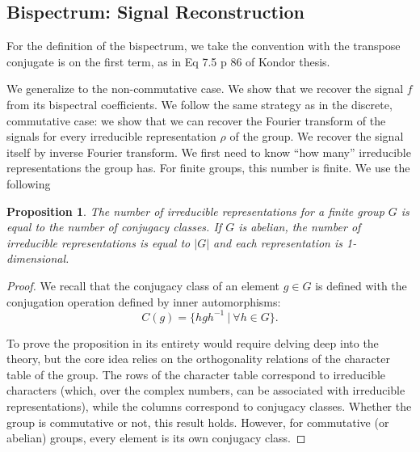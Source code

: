 \documentclass{article}
\newtheorem{proposition}{Proposition}
\begin{document}
\subsection{Bispectrum: Signal Reconstruction}

For the definition of the bispectrum, we take the convention with the transpose conjugate is on the first term, as in Eq 7.5 p 86 of Kondor thesis.






We generalize to the non-commutative case.  We show that we recover the signal $f$ from its bispectral coefficients. We follow the same strategy as in the discrete, commutative case: we show that we can recover the Fourier transform of the signals for every irreducible representation $\rho$ of the group. We recover the signal itself by inverse Fourier transform. We first need to know ``how many'' irreducible representations the group has. For finite groups, this number is finite. We use the following

    \begin{proposition}
        The number of irreducible representations for a finite group $G$ is equal to the number of conjugacy classes. If $G$ is abelian, the number of irreducible representations is equal to $|G|$ and each representation is 1-dimensional.
    \end{proposition}

\begin{proof}
    We recall that the conjugacy class of an element $g \in G$ is defined with the conjugation operation defined by inner automorphisms:
    \begin{equation}
        C(g) = \{ hgh^{-1} ~|~ \forall h \in G\}.
    \end{equation}

    To prove the proposition in its entirety would require delving deep into the theory, but the core idea relies on the orthogonality relations of the character table of the group. The rows of the character table correspond to irreducible characters (which, over the complex numbers, can be associated with irreducible representations), while the columns correspond to conjugacy classes. Whether the group is commutative or not, this result holds. However, for commutative (or abelian) groups, every element is its own conjugacy class.
\end{proof}
\end{document}
